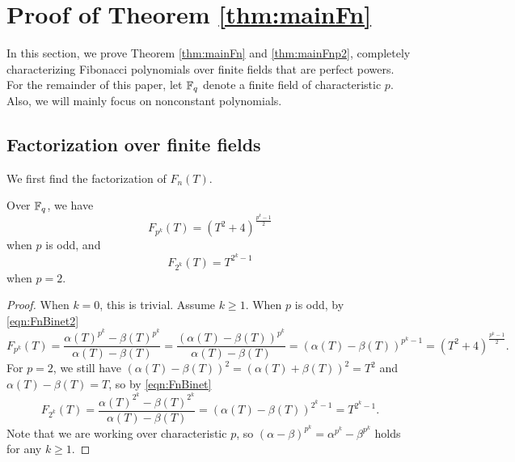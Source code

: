 \section{Proof of Theorem \ref{thm:mainFn}}
\label{sec:main}

In this section, we prove Theorem \ref{thm:mainFn} and \ref{thm:mainFnp2}, completely characterizing Fibonacci polynomials over finite fields that are perfect powers. For the remainder of this paper, let $\mathbb{F}_q$ denote a finite field of characteristic $p$. Also, we will mainly focus on nonconstant polynomials.

\subsection{Factorization over finite fields}

We first find the factorization of $F_n(T)$.


\begin{lemma}
\label{lem:Fpk}
    Over $\mathbb{F}_q$, we have
    \begin{equation}
    \label{eqn:Fpkodd}
        F_{p^k}(T) = (T^2 + 4)^{\frac{p^k - 1}{2}}
    \end{equation}
    when \(p\) is odd, and
    \begin{equation}
    \label{eqn:Fpkeven}
        F_{2^k}(T) = T^{2^k - 1}
    \end{equation}
    when \(p = 2\).
\end{lemma}
\begin{proof}
    When $k = 0$, this is trivial. Assume $k \ge 1$.
    When \(p\) is odd, by \eqref{eqn:FnBinet2}
    \[
        F_{p^k}(T) = \frac{\alpha(T)^{p^k} - \beta(T)^{p^k}}{\alpha(T) - \beta(T)} = \frac{(\alpha(T) - \beta(T))^{p^k}}{\alpha(T) - \beta(T)} = (\alpha(T) - \beta(T))^{p^{k} -1} = (T^2 + 4)^{\frac{p^k -1}{2}}.
    \]
    For \(p = 2\), we still have \((\alpha(T) - \beta(T))^2 = (\alpha(T) + \beta(T))^2 = T^2\) and \(\alpha(T) - \beta(T) = T\), so by \eqref{eqn:FnBinet}
    \[
        F_{2^k}(T) = \frac{\alpha(T)^{2^k} - \beta(T)^{2^k}}{\alpha(T) - \beta(T)} = (\alpha(T) - \beta(T))^{2^k - 1} = T^{2^k - 1}.
    \]
    Note that we are working over characteristic $p$, so $(\alpha - \beta)^{p^k} = \alpha^{p^k} - \beta^{p^k}$ holds for any $k \ge 1$.
\end{proof}

